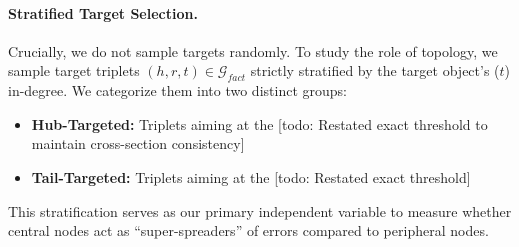 \paragraph{Stratified Target Selection.}
Crucially, we do not sample targets randomly. To study the role of topology, we sample target triplets $(h, r, t) \in \mathcal{G}_{fact}$ strictly stratified by the target object's ($t$) in-degree. We categorize them into two distinct groups:
\begin{itemize}
    \item \textbf{Hub-Targeted:} Triplets aiming at the [todo: Restated exact threshold to maintain cross-section consistency]
    \item \textbf{Tail-Targeted:} Triplets aiming at the [todo: Restated exact threshold]
\end{itemize}
This stratification serves as our primary independent variable to measure whether central nodes act as ``super-spreaders'' of errors compared to peripheral nodes.


